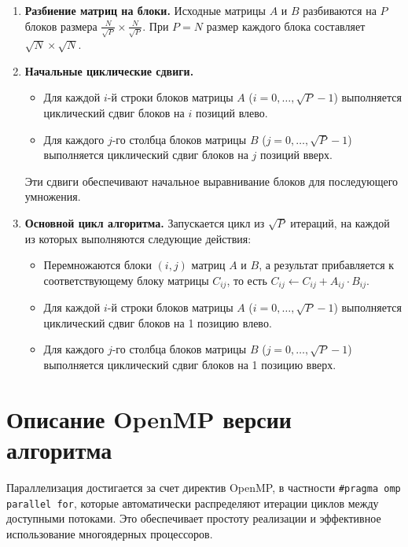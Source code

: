 \documentclass[a4paper,12pt]{article}
\begin{document}
\begin{enumerate}
    \item \textbf{Разбиение матриц на блоки.} 
    Исходные матрицы \( A \) и \( B \) разбиваются на \( P \) блоков размера \( \frac{N}{\sqrt{P}} \times \frac{N}{\sqrt{P}} \). При \( P = N \) размер каждого блока составляет \( \sqrt{N} \times \sqrt{N} \).

    \item \textbf{Начальные циклические сдвиги.}
    \begin{itemize}
        \item Для каждой \( i \)-й строки блоков матрицы \( A \) (\( i = 0, \dots, \sqrt{P} - 1 \)) выполняется циклический сдвиг блоков на \( i \) позиций влево.
        \item Для каждого \( j \)-го столбца блоков матрицы \( B \) (\( j = 0, \dots, \sqrt{P} - 1 \)) выполняется циклический сдвиг блоков на \( j \) позиций вверх.
    \end{itemize}
    Эти сдвиги обеспечивают начальное выравнивание блоков для последующего умножения.

    \item \textbf{Основной цикл алгоритма.} 
    Запускается цикл из \( \sqrt{P} \) итераций, на каждой из которых выполняются следующие действия:
    \begin{itemize}
        \item Перемножаются блоки \( (i, j) \) матриц \( A \) и \( B \), а результат прибавляется к соответствующему блоку матрицы \( C_{ij} \), то есть \( C_{ij} \gets C_{ij} + A_{ij} \cdot B_{ij} \).
        \item Для каждой \( i \)-й строки блоков матрицы \( A \) (\( i = 0, \dots, \sqrt{P} - 1 \)) выполняется циклический сдвиг блоков на 1 позицию влево.
        \item Для каждого \( j \)-го столбца блоков матрицы \( B \) (\( j = 0, \dots, \sqrt{P} - 1 \)) выполняется циклический сдвиг блоков на 1 позицию вверх.
    \end{itemize}
\end{enumerate}

\section{Описание OpenMP версии алгоритма}
Параллелизация достигается за счет директив OpenMP, в частности \texttt{\#pragma omp parallel for}, которые автоматически распределяют итерации циклов между доступными потоками. Это обеспечивает простоту реализации и эффективное использование многоядерных процессоров.
\end{document}
